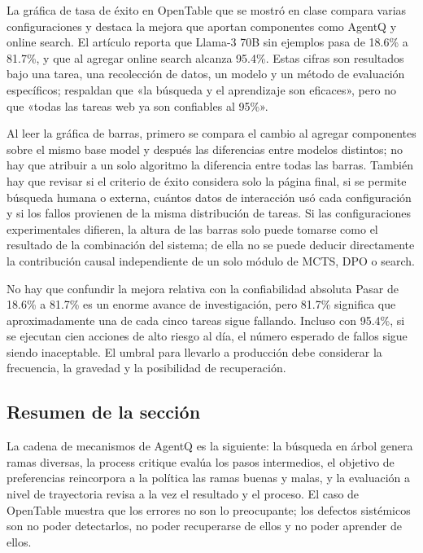 La gráfica de tasa de éxito en OpenTable que se mostró en clase compara varias configuraciones y destaca la mejora que aportan componentes como AgentQ y online search. El artículo reporta que Llama-3 70B sin ejemplos pasa de 18.6\% a 81.7\%, y que al agregar online search alcanza 95.4\%. Estas cifras son resultados bajo una tarea, una recolección de datos, un modelo y un método de evaluación específicos; respaldan que «la búsqueda y el aprendizaje son eficaces», pero no que «todas las tareas web ya son confiables al 95\%».

Al leer la gráfica de barras, primero se compara el cambio al agregar componentes sobre el mismo base model y después las diferencias entre modelos distintos; no hay que atribuir a un solo algoritmo la diferencia entre todas las barras. También hay que revisar si el criterio de éxito considera solo la página final, si se permite búsqueda humana o externa, cuántos datos de interacción usó cada configuración y si los fallos provienen de la misma distribución de tareas. Si las configuraciones experimentales difieren, la altura de las barras solo puede tomarse como el resultado de la combinación del sistema; de ella no se puede deducir directamente la contribución causal independiente de un solo módulo de MCTS, DPO o search.


\begin{warningbox}{No hay que confundir la mejora relativa con la confiabilidad absoluta}
Pasar de 18.6\% a 81.7\% es un enorme avance de investigación, pero 81.7\% significa que aproximadamente una de cada cinco tareas sigue fallando. Incluso con 95.4\%, si se ejecutan cien acciones de alto riesgo al día, el número esperado de fallos sigue siendo inaceptable. El umbral para llevarlo a producción debe considerar la frecuencia, la gravedad y la posibilidad de recuperación.
\end{warningbox}

\subsection{Resumen de la sección}

La cadena de mecanismos de AgentQ es la siguiente: la búsqueda en árbol genera ramas diversas, la process critique evalúa los pasos intermedios, el objetivo de preferencias reincorpora a la política las ramas buenas y malas, y la evaluación a nivel de trayectoria revisa a la vez el resultado y el proceso. El caso de OpenTable muestra que los errores no son lo preocupante; los defectos sistémicos son no poder detectarlos, no poder recuperarse de ellos y no poder aprender de ellos.
